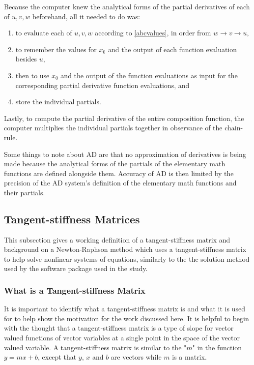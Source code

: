 \documentclass[preprint,12pt]{elsarticle}
\begin{document}
Because the computer knew the analytical forms of the partial derivatives of each of $u,v,w$ beforehand,
all it needed to do was:
\begin{enumerate}
\item to evaluate each of $u,v,w$ according to \ref{abcvalues}, in order from $w \rightarrow
v \rightarrow u$, 
\item to remember the values for $x_0$ and the output of each function evaluation besides  $u$, 
\item then to use $x_0$ and the output of the function evaluations as input for the corresponding partial
derivative function  evaluations, and
\item store the individual partials.
\end{enumerate}
Lastly, to compute the partial derivative of the entire composition function, the computer multiplies
the individual partials together in observance of the chain-rule.  

Some things to note about AD are that no approximation of derivatives is being made because the analytical 
forms of the partials of the elementary math functions are defined alongside them. Accuracy of AD is then limited
by the precision of the AD system's definition of the elementary math functions and their partials.
 
\subsection{Tangent-stiffness Matrices} 

This subsection gives a working definition of a tangent-stiffness matrix and background on a
Newton-Raphson method which uses a tangent-stiffness matrix to help solve nonlinear systems of
equations, similarly to the the solution method used by the software package used in the study.

\subsubsection{What is a Tangent-stiffness Matrix}
\label{tsmat}

It is important to identify what a tangent-stiffness matrix is and what it is used for to help show
the motivation for the work discussed here. It is helpful to begin with the thought that a
tangent-stiffness matrix is a type of slope for vector valued functions of vector variables at
a single point in the space of the vector valued variable. A tangent-stiffness matrix is similar to the
"$m$" in the function $y = mx + b$, except that $y$, $x$ and $b$ are vectors while $m$ is
a matrix. \\
\end{document}
